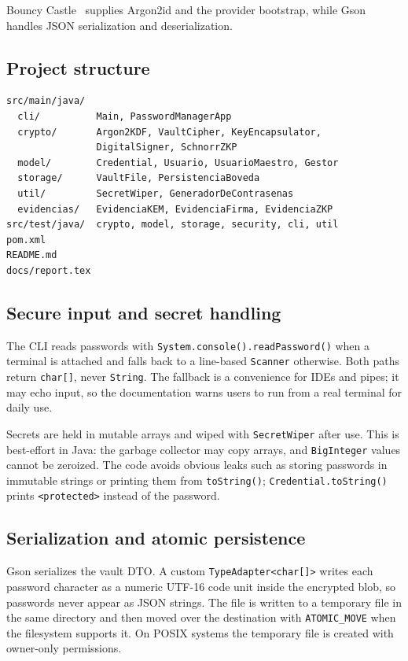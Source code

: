 \documentclass[11pt,a4paper]{article}
\newcommand{\code}[1]{\texttt{#1}}
\begin{document}
Bouncy Castle~\cite{bc} supplies Argon2id and the provider bootstrap, while
Gson~\cite{gson} handles JSON serialization and deserialization.

\subsection{Project structure}

\begin{lstlisting}[style=plaincode,caption={Source tree.},label={lst:tree}]
src/main/java/
  cli/          Main, PasswordManagerApp
  crypto/       Argon2KDF, VaultCipher, KeyEncapsulator,
                DigitalSigner, SchnorrZKP
  model/        Credential, Usuario, UsuarioMaestro, Gestor
  storage/      VaultFile, PersistenciaBoveda
  util/         SecretWiper, GeneradorDeContrasenas
  evidencias/   EvidenciaKEM, EvidenciaFirma, EvidenciaZKP
src/test/java/  crypto, model, storage, security, cli, util
pom.xml
README.md
docs/report.tex
\end{lstlisting}

\subsection{Secure input and secret handling}

The CLI reads passwords with \code{System.console().readPassword()} when a
terminal is attached and falls back to a line-based \code{Scanner} otherwise.
Both paths return \code{char[]}, never \code{String}. The fallback is a
convenience for IDEs and pipes; it may echo input, so the documentation warns
users to run from a real terminal for daily use.

Secrets are held in mutable arrays and wiped with \code{SecretWiper} after use.
This is best-effort in Java: the garbage collector may copy arrays, and
\code{BigInteger} values cannot be zeroized. The code avoids obvious leaks such
as storing passwords in immutable strings or printing them from \code{toString()};
\code{Credential.toString()} prints \code{<protected>} instead of the password.

\subsection{Serialization and atomic persistence}

Gson serializes the vault DTO. A custom \code{TypeAdapter<char[]>} writes each
password character as a numeric UTF-16 code unit inside the encrypted blob, so
passwords never appear as JSON strings. The file is written to a temporary file
in the same directory and then moved over the destination with
\code{ATOMIC\_MOVE} when the filesystem supports it. On POSIX systems the
temporary file is created with owner-only permissions.
\end{document}
